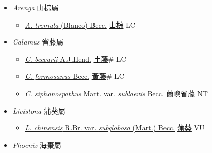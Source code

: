 
  \begin{itemize}
 \item[] \textit{Arenga} 山棕屬
                    
  \begin{itemize}
        \item[] \href{http://www.theplantlist.org/tpl1.1/search?q=Arenga+tremula}{\textit{A. tremula} (Blanco) Becc.}   \href{\detokenize{http://taibnet.sinica.edu.tw/chi/taibnet_species_list.php?T2=山棕&T2_new_value=true&fr=y}}{山棕} LC
  \end{itemize}
 \item[] \textit{Calamus} 省藤屬
                    
  \begin{itemize}
        \item[] \href{http://www.theplantlist.org/tpl1.1/search?q=Calamus+beccarii}{\textit{C. beccarii} A.J.Hend.}   \href{\detokenize{http://taibnet.sinica.edu.tw/chi/taibnet_species_list.php?T2=土藤&T2_new_value=true&fr=y}}{土藤}\# LC
        \item[] \href{http://www.theplantlist.org/tpl1.1/search?q=Calamus+formosanus}{\textit{C. formosanus} Becc.}     \href{\detokenize{http://taibnet.sinica.edu.tw/chi/taibnet_species_list.php?T2=黃藤&T2_new_value=true&fr=y}}{黃藤}\# LC
        \item[] \href{http://www.theplantlist.org/tpl1.1/search?q=Calamus+siphonospathus+var.+sublaevis}{\textit{C. siphonospathus} Mart. var. \textit{sublaevis} Becc.}   \href{\detokenize{http://taibnet.sinica.edu.tw/chi/taibnet_species_list.php?T2=蘭嶼省藤&T2_new_value=true&fr=y}}{蘭嶼省藤} NT
  \end{itemize}
 \item[] \textit{Livistona} 蒲葵屬
                    
  \begin{itemize}
        \item[] \href{http://www.theplantlist.org/tpl1.1/search?q=Livistona+chinensis+var.+subglobosa}{\textit{L. chinensis} R.Br. var. \textit{subglobosa} (Mart.) Becc.}   \href{\detokenize{http://taibnet.sinica.edu.tw/chi/taibnet_species_list.php?T2=蒲葵&T2_new_value=true&fr=y}}{蒲葵} VU
  \end{itemize}
 \item[] \textit{Phoenix} 海棗屬
                    

\end{itemize}

